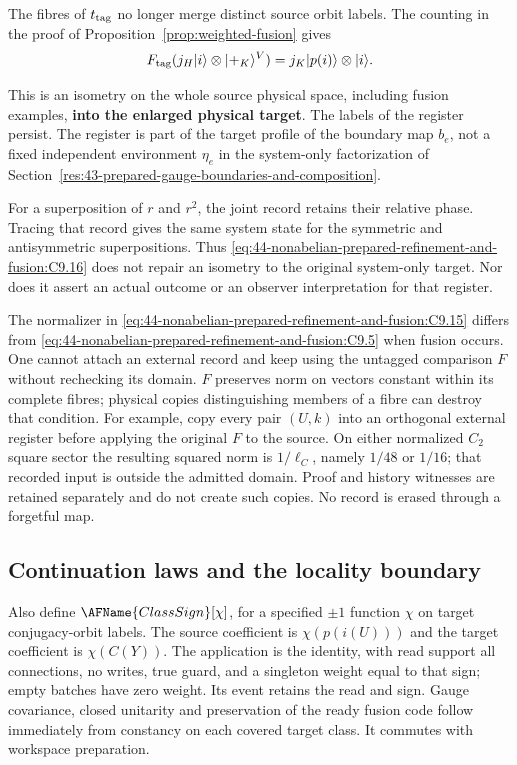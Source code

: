 The fibres of $t_{\rm tag}$ no longer merge distinct source orbit labels.  The
counting in the proof of Proposition~\ref{prop:weighted-fusion} gives
\begin{equation}
F_{\rm tag}(j_H|i\rangle\otimes|+_K\rangle^V)
     =j_K|p(i)\rangle\otimes|i\rangle.
 \label{eq:44-nonabelian-prepared-refinement-and-fusion:C9.16}
\end{equation}

This is an isometry on the whole source physical space, including fusion
examples, \textbf{into the enlarged physical target}.  The labels of the
register persist.  The register is part of the target profile of the boundary
map $b_e$, not a fixed independent environment $\eta_e$ in the system-only
factorization of Section~\ref{res:43-prepared-gauge-boundaries-and-composition}.

For a superposition of $r$ and $r^2$, the joint record retains their relative
phase.  Tracing that record gives the same system state for the symmetric and
antisymmetric superpositions.  Thus
\eqref{eq:44-nonabelian-prepared-refinement-and-fusion:C9.16} does not repair
an isometry to the original system-only target.  Nor does it assert an actual
outcome or an observer interpretation for that register.

The normalizer in \eqref{eq:44-nonabelian-prepared-refinement-and-fusion:C9.15}
differs from \eqref{eq:44-nonabelian-prepared-refinement-and-fusion:C9.5} when
fusion occurs.  One cannot attach an external record and keep using the
untagged comparison $F$ without rechecking its domain.  $F$ preserves norm on
vectors constant within its complete fibres; physical copies distinguishing
members of a fibre can destroy that condition.  For example, copy every pair
$(U,k)$ into an orthogonal external register before applying the original $F$
to the source.  On either normalized $C_2$ square sector the resulting squared
norm is $1/\ell_C$, namely $1/48$ or $1/16$; that recorded input is outside the
admitted domain.  Proof and history witnesses are retained separately and do
not create such copies.  No record is erased through a forgetful map.

\subsection{Continuation laws and the locality boundary}\label{md:44-nonabelian-prepared-refinement-and-fusion:continuation-laws-and-the-locality-boundary}

Also define $\AFName{ClassSign}[\chi]$, for a specified $\pm1$ function $\chi$
on target conjugacy-orbit labels.  The source coefficient is $\chi(p(i(U)))$
and the target coefficient is $\chi(C(Y))$.  The application is the identity,
with read support all connections, no writes, true guard, and a singleton
weight equal to that sign; empty batches have zero weight.  Its event retains
the read and sign.  Gauge covariance, closed unitarity and preservation of the
ready fusion code follow immediately from constancy on each covered target
class.  It commutes with workspace preparation.


